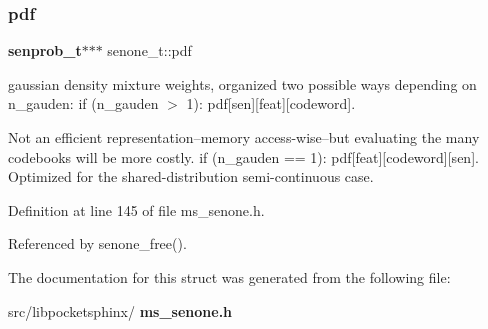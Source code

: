 \subsubsection{pdf}
{\footnotesize\ttfamily \textbf{ senprob\+\_\+t}$\ast$$\ast$$\ast$ senone\+\_\+t\+::pdf}



gaussian density mixture weights, organized two possible ways depending on n\+\_\+gauden\+: if (n\+\_\+gauden $>$ 1)\+: pdf[sen][feat][codeword]. 

Not an efficient representation--memory access-\/wise--but evaluating the many codebooks will be more costly. if (n\+\_\+gauden == 1)\+: pdf[feat][codeword][sen]. Optimized for the shared-\/distribution semi-\/continuous case. 

Definition at line 145 of file ms\+\_\+senone.\+h.



Referenced by senone\+\_\+free().



The documentation for this struct was generated from the following file\+:\begin{DoxyCompactItemize}
\item 
src/libpocketsphinx/\textbf{ ms\+\_\+senone.\+h}\end{DoxyCompactItemize}
